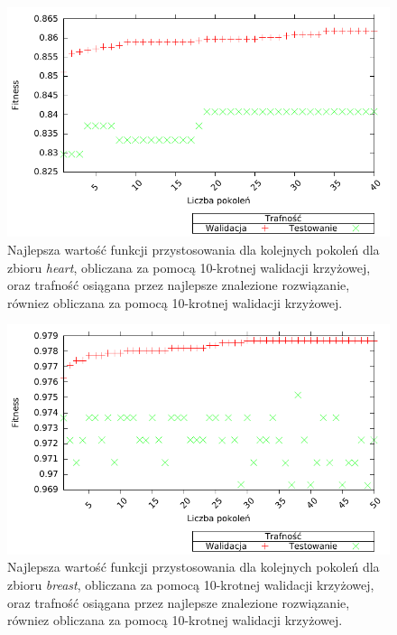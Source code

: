 	\begin{figure}
		\includegraphics[scale=0.90]{figures/results/fitness/fitness-heart-CV}
		\caption{Najlepsza wartość funkcji przystosowania dla kolejnych pokoleń dla zbioru \emph{heart}, obliczana za pomocą 10-krotnej walidacji krzyżowej, oraz trafność osiągana przez najlepsze znalezione rozwiązanie, równiez obliczana za pomocą 10-krotnej walidacji krzyżowej. \label{fig:fit-heart-cv}}
	\end{figure}
	
	\begin{figure}
		\includegraphics[scale=0.90]{figures/results/fitness/fitness-breast-CV}
		\caption{Najlepsza wartość funkcji przystosowania dla kolejnych pokoleń dla zbioru \emph{breast}, obliczana za pomocą 10-krotnej walidacji krzyżowej, oraz trafność osiągana przez najlepsze znalezione rozwiązanie, równiez obliczana za pomocą 10-krotnej walidacji krzyżowej. \label{fig:fit-breast-cv}}
	\end{figure}	 
               
